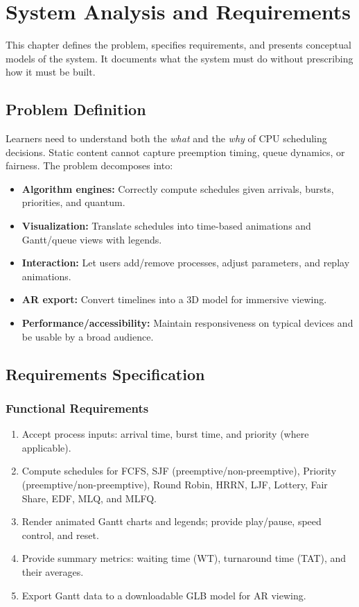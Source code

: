 \documentclass[12pt,a4paper,oneside]{report}
\begin{document}
\chapter{System Analysis and Requirements}
\noindent This chapter defines the problem, specifies requirements, and presents conceptual models of the system. It documents what the system must do without prescribing how it must be built.

\section{Problem Definition}
Learners need to understand both the \emph{what} and the \emph{why} of CPU scheduling decisions. Static content cannot capture preemption timing, queue dynamics, or fairness. The problem decomposes into:
\begin{itemize}
  \item \textbf{Algorithm engines:} Correctly compute schedules given arrivals, bursts, priorities, and quantum.
  \item \textbf{Visualization:} Translate schedules into time-based animations and Gantt/queue views with legends.
  \item \textbf{Interaction:} Let users add/remove processes, adjust parameters, and replay animations.
  \item \textbf{AR export:} Convert timelines into a 3D model for immersive viewing.
  \item \textbf{Performance/accessibility:} Maintain responsiveness on typical devices and be usable by a broad audience.
\end{itemize}

\section{Requirements Specification}
\subsection*{Functional Requirements}
\begin{enumerate}
  \item Accept process inputs: arrival time, burst time, and priority (where applicable).
  \item Compute schedules for FCFS, SJF (preemptive/non-preemptive), Priority (preemptive/non-preemptive), Round Robin, HRRN, LJF, Lottery, Fair Share, EDF, MLQ, and MLFQ.
  \item Render animated Gantt charts and legends; provide play/pause, speed control, and reset.
  \item Provide summary metrics: waiting time (WT), turnaround time (TAT), and their averages.
  \item Export Gantt data to a downloadable GLB model for AR viewing.
\end{enumerate}
\end{document}
